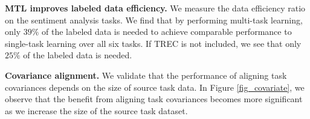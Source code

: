 
\textbf{MTL improves labeled data efficiency.}
We measure the data efficiency ratio on the sentiment analysis tasks.
We find that by performing multi-task learning, only $39\%$ of the labeled data is needed to achieve comparable performance to single-task learning over all six tasks.
If TREC is not included, we see that only $25\%$ of the labeled data is needed.


\textbf{Covariance alignment.}
We validate that the performance of aligning task covariances depends on the size of source task data.
In Figure \ref{fig_covariate}, we observe that the benefit from aligning task covariances becomes more significant as we increase the size of the source task dataset.

